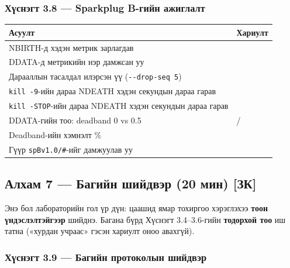 \hypertarget{ux445ux4afux441ux43dux44dux433ux442-3.8-sparkplug-b-ux433ux438ux439ux43d-ux430ux436ux438ux433ux43bux430ux43bux442}{%
\subsubsection{Хүснэгт 3.8 --- Sparkplug B-гийн ажиглалт}\label{ux445ux4afux441ux43dux44dux433ux442-3.8-sparkplug-b-ux433ux438ux439ux43d-ux430ux436ux438ux433ux43bux430ux43bux442}}

\begingroup\scriptsize\begin{longtable}[]{@{}ll@{}}
\toprule
Асуулт & Хариулт\tabularnewline
\midrule
\endhead
NBIRTH-д хэдэн метрик зарлагдав &\tabularnewline
DDATA-д метрикийн нэр дамжсан уу &\tabularnewline
Дарааллын тасалдал илэрсэн үү (\texttt{-\/-drop-seq\ 5}) &\tabularnewline
\texttt{kill\ -9}-ийн дараа NDEATH хэдэн секундын дараа гарав &\tabularnewline
\texttt{kill\ -STOP}-ийн дараа NDEATH хэдэн секундын дараа гарав &\tabularnewline
DDATA-гийн тоо: deadband 0 vs 0.5 & /\tabularnewline
Deadband-ийн хэмнэлт \% &\tabularnewline
Гүүр \texttt{spBv1.0/\#}-ийг дамжуулав уу &\tabularnewline
\bottomrule
\end{longtable}\endgroup

\hypertarget{ux430ux43bux445ux430ux43c-7-ux431ux430ux433ux438ux439ux43d-ux448ux438ux439ux434ux432ux44dux440-20-ux43cux438ux43d-ux437ux43a}{%
\subsection{Алхам 7 --- Багийн шийдвэр (20 мин) {[}ЗК{]}}\label{ux430ux43bux445ux430ux43c-7-ux431ux430ux433ux438ux439ux43d-ux448ux438ux439ux434ux432ux44dux440-20-ux43cux438ux43d-ux437ux43a}}

Энэ бол лабораторийн гол үр дүн: цаашид ямар тохиргоо хэрэглэхээ \textbf{тоон үндэслэлтэйгээр} шийднэ. Багана бүрд Хүснэгт 3.4--3.6-гийн \textbf{тодорхой тоо} иш татна («хурдан учраас» гэсэн хариулт оноо авахгүй).

\hypertarget{ux445ux4afux441ux43dux44dux433ux442-3.9-ux431ux430ux433ux438ux439ux43d-ux43fux440ux43eux442ux43eux43aux43eux43bux44bux43d-ux448ux438ux439ux434ux432ux44dux440}{%
\subsubsection{Хүснэгт 3.9 --- Багийн протоколын шийдвэр}\label{ux445ux4afux441ux43dux44dux433ux442-3.9-ux431ux430ux433ux438ux439ux43d-ux43fux440ux43eux442ux43eux43aux43eux43bux44bux43d-ux448ux438ux439ux434ux432ux44dux440}}

